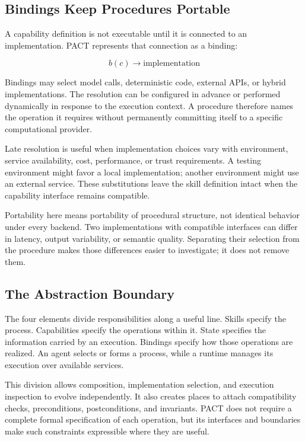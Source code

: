 \documentclass[10pt,twocolumn,a4paper]{article}
\begin{document}
\subsection{Bindings Keep Procedures Portable}

A capability definition is not executable until it is connected to an implementation. PACT represents that connection as a binding:


\begin{equation}b(c) \rightarrow \mathrm{implementation}\end{equation}

Bindings may select model calls, deterministic code, external APIs, or hybrid implementations. The resolution can be configured in advance or performed dynamically in response to the execution context. A procedure therefore names the operation it requires without permanently committing itself to a specific computational provider.


Late resolution is useful when implementation choices vary with environment, service availability, cost, performance, or trust requirements. A testing environment might favor a local implementation; another environment might use an external service. These substitutions leave the skill definition intact when the capability interface remains compatible.


Portability here means portability of procedural structure, not identical behavior under every backend. Two implementations with compatible interfaces can differ in latency, output variability, or semantic quality. Separating their selection from the procedure makes those differences easier to investigate; it does not remove them.


\subsection{The Abstraction Boundary}

The four elements divide responsibilities along a useful line. Skills specify the process. Capabilities specify the operations within it. State specifies the information carried by an execution. Bindings specify how those operations are realized. An agent selects or forms a process, while a runtime manages its execution over available services.


This division allows composition, implementation selection, and execution inspection to evolve independently. It also creates places to attach compatibility checks, preconditions, postconditions, and invariants. PACT does not require a complete formal specification of each operation, but its interfaces and boundaries make such constraints expressible where they are useful.
\end{document}
